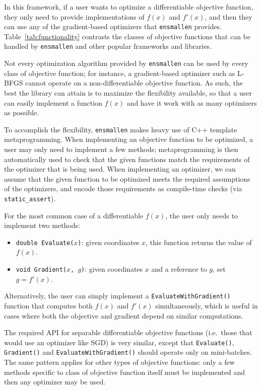 \documentclass{article}
\begin{document}
In this framework, if a user wants to optimize a differentiable objective
function, they only need to provide implementations of $f(x)$ and $f'(x)$, and
then they can use any of the gradient-based optimizers that {\tt ensmallen}
provides.  Table~\ref{tab:functionality} contrasts 
the classes of objective functions that can be handled by {\tt ensmallen}
and other popular frameworks and libraries.

Not every optimization algorithm provided by {\tt ensmallen} can be
used by every class of objective function; for instance, a gradient-based
optimizer such as L-BFGS cannot operate on a non-differentiable objective
function.
As such, the best the library can attain is to maximize the flexibility
available, so that a user can easily implement a function $f(x)$ and have it
work with as many optimizers as possible.

To accomplish the flexibility, {\tt ensmallen} makes heavy use of
C++ template metaprogramming.
When implementing an objective function to be optimized,
a user may only need to implement a few methods; metaprogramming is then automatically
used to check that the given functions match the requirements of the
optimizer that is being used.  When implementing an optimizer, we can assume
that the given function to be optimized meets the required assumptions of the
optimizers, and encode those requirements as compile-time checks
(via \texttt{static\_assert}).

For the most common case of a differentiable $f(x)$, the user only needs to
implement two methods:

\vspace*{-0.3em}
\begin{itemize} \itemsep -1pt
  \item \texttt{double Evaluate($x$)}: given coordinates $x$, this function
returns the value of $f(x)$.
  \item \texttt{void Gradient($x$, $g$)}: given coordinates $x$ and a reference
to $g$, set $g = f'(x)$.
\end{itemize}
\vspace*{-0.3em}

Alternatively, the user can simply implement a \texttt{EvaluateWithGradient()}
function that computes both $f(x)$ and $f'(x)$ simultaneously, which is useful
in cases where both the objective and gradient depend on similar computations.

The required API for separable differentiable objective functions (i.e.~those
that would use an optimizer like SGD) is very similar, except that
\texttt{Evaluate()}, \texttt{Gradient()} and \texttt{EvaluateWithGradient()}
should operate only on mini-batches.  The same pattern applies for other
types of objective functions: only a few methods specific to class of objective
function itself must be implemented and then any optimizer may be used.
\end{document}
